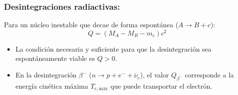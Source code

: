 \subsubsection*{Desintegraciones radiactivas:}
Para un núcleo inestable que decae de forma espontánea ($A \longrightarrow B + c$):
\begin{equation}
Q = (M_A - M_B - m_c) c^2
\end{equation}
\begin{itemize}
    \item La condición necesaria y suficiente para que la desintegración sea espontáneamente viable es $Q > 0$.
    \item En la desintegración $\beta^-$ ($n \to p + e^- + \bar{\nu}_e$), el valor $Q_{\beta^-}$ corresponde a la energía cinética máxima $T_{e,\text{máx}}$ que puede transportar el electrón.
\end{itemize}

\newpage

